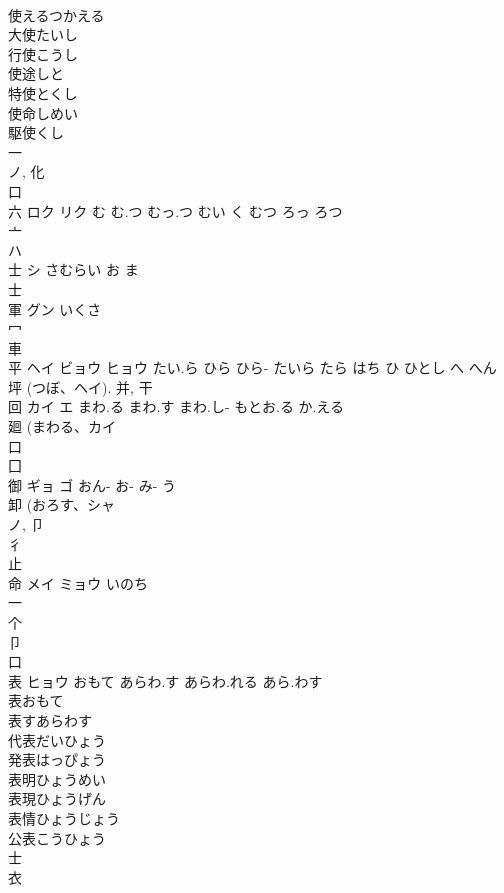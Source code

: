 \documentclass[8pt]{extreport}
\begin{document}
\begin{CJK}{UTF8}{min}
\\	使えるつかえる 
\\	大使たいし 
\\	行使こうし 
\\	使途しと 
\\	特使とくし 
\\	使命しめい 
\\	駆使くし 
\\	一 
\\	ノ, 化 
\\	口 
\\	六	ロク リク	む む.つ むっ.つ むい く むつ ろっ ろつ	
\\	亠 
\\	ハ	
\\	士	シ	さむらい お ま	
\\	士 
\\	軍	グン	いくさ	
\\	冖 
\\	車 
\\	平	ヘイ ビョウ ヒョウ	たい.ら ひら ひら- たいら たら はち ひ ひとし へ へん	
\\	坪 (つぼ、ヘイ).			并, 干 
\\	回	カイ エ	まわ.る まわ.す まわ.し- もとお.る か.える	
\\	廻 (まわる、カイ 
\\	口 
\\	囗 
\\	御	ギョ ゴ	おん- お- み- う	
\\	卸 (おろす、シャ 
\\	ノ, 卩 
\\	彳 
\\	止 
\\	命	メイ ミョウ	いのち	
\\	一 
\\	个 
\\	卩 
\\	口 
\\	表	ヒョウ	おもて あらわ.す あらわ.れる あら.わす	
\\	表おもて 
\\	表すあらわす 
\\	代表だいひょう 
\\	発表はっぴょう 
\\	表明ひょうめい 
\\	表現ひょうげん 
\\	表情ひょうじょう 
\\	公表こうひょう 
\\	士 
\\	衣 

\end{CJK}
\end{document}
